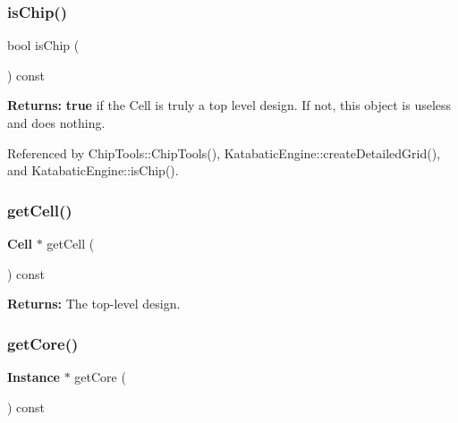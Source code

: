 \subsubsection{\texorpdfstring{is\+Chip()}{isChip()}}
{\footnotesize\ttfamily bool is\+Chip (\begin{DoxyParamCaption}{ }\end{DoxyParamCaption}) const\hspace{0.3cm}{\ttfamily [inline]}}

{\bfseries Returns\+:} {\bfseries true} if the Cell is truly a top level design. If not, this object is useless and does nothing. 

Referenced by Chip\+Tools\+::\+Chip\+Tools(), Katabatic\+Engine\+::create\+Detailed\+Grid(), and Katabatic\+Engine\+::is\+Chip().

\mbox{\label{classKatabatic_1_1ChipTools_a55a3a88610ef1af9931e634f77f2403b}} 
\subsubsection{\texorpdfstring{get\+Cell()}{getCell()}}
{\footnotesize\ttfamily \textbf{ Cell} $\ast$ get\+Cell (\begin{DoxyParamCaption}{ }\end{DoxyParamCaption}) const\hspace{0.3cm}{\ttfamily [inline]}}

{\bfseries Returns\+:} The top-\/level design. \mbox{\label{classKatabatic_1_1ChipTools_a8be5c4aecbe9b97ed2eb9557b046b091}} 
\subsubsection{\texorpdfstring{get\+Core()}{getCore()}}
{\footnotesize\ttfamily \textbf{ Instance} $\ast$ get\+Core (\begin{DoxyParamCaption}{ }\end{DoxyParamCaption}) const\hspace{0.3cm}{\ttfamily [inline]}}


